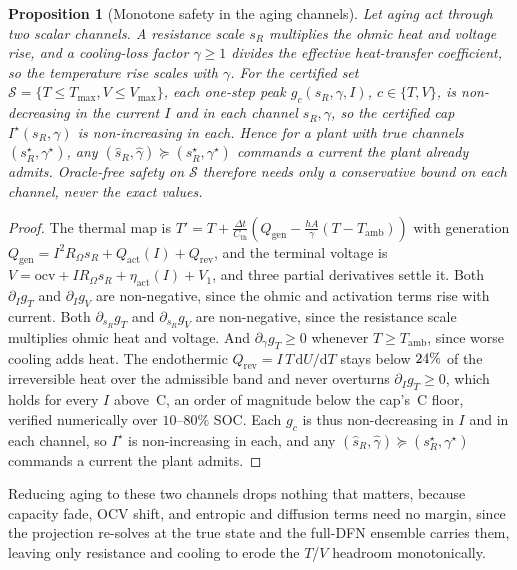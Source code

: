 \documentclass[conference]{IEEEtran}
\newtheorem{proposition}{Proposition}
\newcommand{\SI}[2]{#1\,#2}
\begin{document}
\begin{proposition}[Monotone safety in the aging channels]\label{prop:mono}
Let aging act through two scalar channels. A resistance scale $s_R$ multiplies the ohmic heat
and voltage rise, and a cooling-loss factor $\gamma\ge1$ divides the effective heat-transfer
coefficient, so the temperature rise scales with $\gamma$. For the certified set
$\mathcal S=\{T\le T_{\max},V\le V_{\max}\}$, each one-step peak $g_c(s_R,\gamma,I)$,
$c\in\{T,V\}$, is non-decreasing in the current $I$ and in \emph{each} channel $s_R,\gamma$, so
the certified cap $I^\star(s_R,\gamma)$ is non-increasing in each. Hence for a plant with true
channels $(s_R^\star,\gamma^\star)$, any $(\hat s_R,\hat\gamma)\succeq(s_R^\star,\gamma^\star)$
commands a current the plant already admits. Oracle-free safety on $\mathcal S$ therefore needs
only a conservative \emph{bound on each channel}, never the exact values.
\end{proposition}
\begin{proof}
The thermal map is $T'{=}T{+}\tfrac{\Delta t}{C_\mathrm{th}}(Q_\mathrm{gen}{-}\tfrac{hA}{\gamma}(T{-}T_\mathrm{amb}))$
with generation $Q_\mathrm{gen}{=}I^2R_\Omega s_R{+}Q_\mathrm{act}(I){+}Q_\mathrm{rev}$, and the terminal
voltage is $V{=}\mathrm{ocv}{+}IR_\Omega s_R{+}\eta_\mathrm{act}(I){+}V_1$, and three partial derivatives settle it.
Both $\partial_I g_T$ and $\partial_I g_V$ are non-negative, since the ohmic and activation terms rise
with current. Both $\partial_{s_R}g_T$ and $\partial_{s_R}g_V$ are non-negative, since the resistance
scale multiplies ohmic heat and voltage. And $\partial_\gamma g_T\ge0$ whenever $T\ge T_\mathrm{amb}$,
since worse cooling adds heat. The endothermic $Q_\mathrm{rev}{=}I\,T\,\mathrm dU/\mathrm dT$ stays below
$24\%$ of the irreversible heat over the admissible band and never overturns $\partial_I g_T\ge0$,
which holds for every $I$ above \SI{\monoImin}{C}, an order of magnitude below the cap's
\SI{\platCapFloor}{C} floor, verified numerically over $10$--$80\%$ SOC. Each $g_c$ is thus non-decreasing in $I$ and in each channel, so $I^\star$ is non-increasing in each,
and any $(\hat s_R,\hat\gamma)\succeq(s_R^\star,\gamma^\star)$ commands a current the plant admits.
\end{proof}
Reducing aging to these two channels drops nothing that matters, because capacity fade, OCV shift,
and entropic and diffusion terms need no margin, since the projection re-solves at the true state and the full-DFN ensemble
carries them, leaving only resistance and cooling to erode the $T$/$V$ headroom monotonically.
\end{document}
